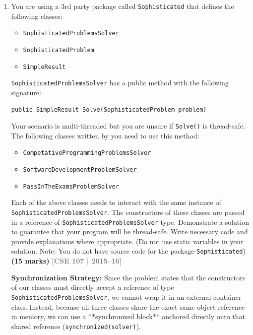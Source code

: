 \documentclass[12pt,a3paper]{article}
\newcommand{\yr}[1]{\hfill\textcolor{gray}{\small\textbf{[#1]}}}
\newcommand{\mk}[1]{\textcolor{orange!70!black}{\small\textbf{(#1 marks)}}}
\begin{document}
\begin{enumerate}
\item You are using a 3rd party package called \texttt{Sophisticated} that defines the following classes:
\begin{itemize}
    \item \texttt{SophisticatedProblemsSolver}
    \item \texttt{SophisticatedProblem}
    \item \texttt{SimpleResult}
\end{itemize}
\texttt{SophisticatedProblemsSolver} has a public method with the following signature:
\begin{center}
    \texttt{public SimpleResult Solve(SophisticatedProblem problem)}
\centerline{}
\end{center}
Your scenario is multi-threaded but you are unsure if \texttt{Solve()} is thread-safe. The following classes written by you need to use this method:
\begin{itemize}
    \item \texttt{CompetativeProgrammingProblemsSolver}
    \item \texttt{SoftwareDevelopmentProblemSolver}
    \item \texttt{PassInTheExamsProblemSolver}
\end{itemize}
Each of the above classes needs to interact with the same instance of \texttt{SophisticatedProblemsSolver}. The constructors of these classes are passed in a reference of \texttt{SophisticatedProblemsSolver} type. Demonstrate a solution to guarantee that your program will be thread-safe. Write necessary code and provide explanations where appropriate. (Do not use static variables in your solution. Note: You do not have source code for the package \texttt{Sophisticated}) \mk{15}
\yr{CSE 107 | 2015--16}

\begin{tcolorbox}[enhanced,breakable,ansbox,
  colback=cF!4,colframe=cF,boxrule=0.8pt,arc=5pt,
  title={\textbf{Answer --- Thread-Safe Cooperation on a Shared Object Reference}},
  fonttitle=\bfseries\color{white},colbacktitle=cF]

\textbf{Synchronization Strategy:}
Since the problem states that the constructors of our classes must directly accept a reference of type \texttt{SophisticatedProblemsSolver}, we cannot wrap it in an external container class. Instead, because all three classes share the exact same object reference in memory, we can use a **synchronized block** anchored directly onto that shared reference (\texttt{synchronized(solver)}). 


\end{tcolorbox}
\end{enumerate}
\end{document}
